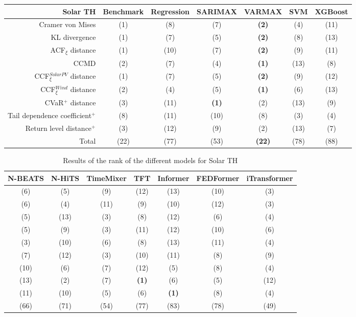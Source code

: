 \newpage
\begin{table}[ht]
    \footnotesize
    \begin{tabular}[l]{r|c|ccc|cc|}
        \toprule
        \textbf{Solar TH} &Benchmark&Regression&SARIMAX&VARMAX&SVM&XGBoost \\
        \midrule            
        Cramer von Mises&(1)&(8)&(7)&\textbf{(2)}&(4)&(11) \\
        KL divergence&(1)&(7)&(5)&\textbf{(2)}&(8)&(13) \\
        ACF$_\xi$ distance&(1)&(10)&(7)&\textbf{(2)}&(9)&(11) \\
        \midrule
        CCMD&(2)&(7)&(4)&\textbf{(1)}&(13)&(8) \\
        CCF$_\xi^{Solar PV}$ distance&(1)&(7)&(5)&\textbf{(2)}&(9)&(12) \\
        CCF$_\xi^{Wind}$ distance&(2)&(4)&(5)&\textbf{(1)}&(6)&(13) \\
        \midrule
        CVaR$^+$ distance&(3)&(11)&\textbf{(1)}&(2)&(13)&(9) \\
        Tail dependence coefficient$^+$&(8)&(11)&(10)&(8)&(3)&(4) \\
        Return level distance$^+$&(3)&(12)&(9)&(2)&(13)&(7) \\
        \bottomrule
        Total&(22)&(77)&(53)&\textbf{(22)}&(78)&(88) \\
\bottomrule
    \end{tabular}
\end{table}
\begin{table}[ht]
    \footnotesize
    \begin{flushright}
    \begin{tabular}[r]{|ccc|cccc}
        \toprule
        N-BEATS&N-HiTS&TimeMixer&TFT&Informer&FEDFormer&iTransformer \\
        \midrule            
        (6)&(5)&(9)&(12)&(13)&(10)&(3) \\
        (6)&(4)&(11)&(9)&(10)&(12)&(3) \\
        (5)&(13)&(3)&(8)&(12)&(6)&(4) \\
        \midrule
        (5)&(9)&(3)&(11)&(12)&(10)&(6) \\
        (3)&(10)&(6)&(8)&(13)&(11)&(4) \\
        (7)&(12)&(3)&(10)&(11)&(8)&(9) \\
        \midrule
        (10)&(6)&(7)&(12)&(5)&(8)&(4) \\
        (13)&(2)&(7)&\textbf{(1)}&(6)&(5)&(12) \\
        (11)&(10)&(5)&(6)&\textbf{(1)}&(8)&(4) \\
        \bottomrule
        (66)&(71)&(54)&(77)&(83)&(78)&(49) \\
        \bottomrule
    \end{tabular}
    \end{flushright}
    \caption{Results of the rank of the different models for Solar TH\label{long}}
    \label{table:results-rank-solar-pv}
\end{table}

